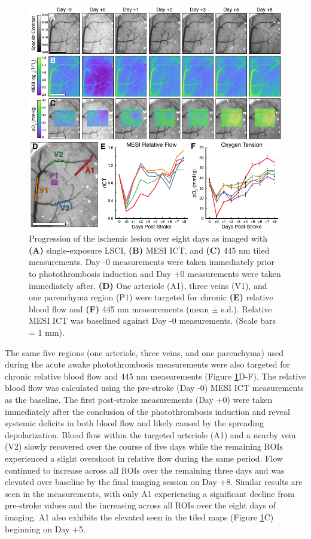 \begin{figure}
    \includegraphics{figures/chapter_5/chronicawakephotothrombosis.pdf}
    \caption{
        \label{fig:chronicawakephotothrombosis}
        Progression of the ischemic lesion over eight days as imaged with \textbf{(A)} single-exposure LSCI, \textbf{(B)} MESI ICT, and \textbf{(C)} 445 nm tiled  measurements. Day -0 measurements were taken immediately prior to photothrombosis induction and Day +0 measurements were taken immediately after. \textbf{(D)} One arteriole (A1), three veins (V1), and one parenchyma region (P1) were targeted for chronic \textbf{(E)} relative blood flow and \textbf{(F)} 445 nm  measurements (mean $\pm$ s.d.). Relative MESI ICT was baselined against Day -0 measurements. (Scale bars = 1 mm).
    }
\end{figure}

The same five regions (one arteriole, three veins, and one parenchyma) used during the acute awake photothrombosis measurements were also targeted for chronic relative blood flow and 445 nm  measurements (Figure \ref{fig:chronicawakephotothrombosis}D-F). The relative blood flow was calculated using the pre-stroke (Day -0) MESI ICT measurements as the baseline. The first post-stroke measurements (Day +0) were taken immediately after the conclusion of the photothrombosis induction and reveal systemic deficits in both blood flow and  likely caused by the spreading depolarization. Blood flow within the targeted arteriole (A1) and a nearby vein (V2) slowly recovered over the course of five days while the remaining ROIs experienced a slight overshoot in relative flow during the same period. Flow continued to increase across all ROIs over the remaining three days and was elevated over baseline by the final imaging session on Day +8. Similar results are seen in the  measurements, with only A1 experiencing a significant decline from pre-stroke values and the  increasing across all ROIs over the eight days of imaging. A1 also exhibits the elevated  seen in the tiled maps (Figure \ref{fig:chronicawakephotothrombosis}C) beginning on Day +5.


